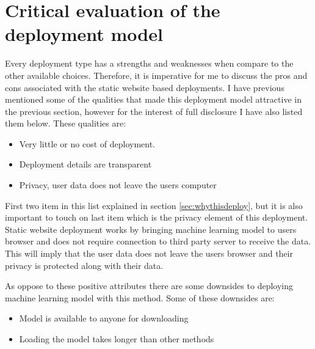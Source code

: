 \section{Critical evaluation of the deployment model}
Every deployment type has a strengths and weaknesses when compare to the other available choices.
Therefore, it is imperative for me to discuss the pros and cons associated with the static website based deployments.
I have previous mentioned some of the qualities that made this deployment model attractive in the previous section, however for the interest of full disclosure I have also listed them below.
These qualities are:

\begin{itemize}
    \item Very little or no cost of deployment.
    \item Deployment details are transparent
    \item Privacy, user data does not leave the users computer
\end{itemize}

First two item in this list explained in section \ref{sec:whythisdeploy}, but it is also important to touch on last item which is the privacy element of this deployment.
Static website deployment works by bringing machine learning model to users browser and does not require connection to third party server to receive the data.
This will imply that the user data does not leave the users browser and their privacy is protected along with their data.

As oppose to these positive attributes there are some downsides to deploying machine learning model with this method.
Some of these downsides are:

\begin{itemize}
    \item Model is available to anyone for downloading
    \item Loading the model takes longer than other methods
\end{itemize}

